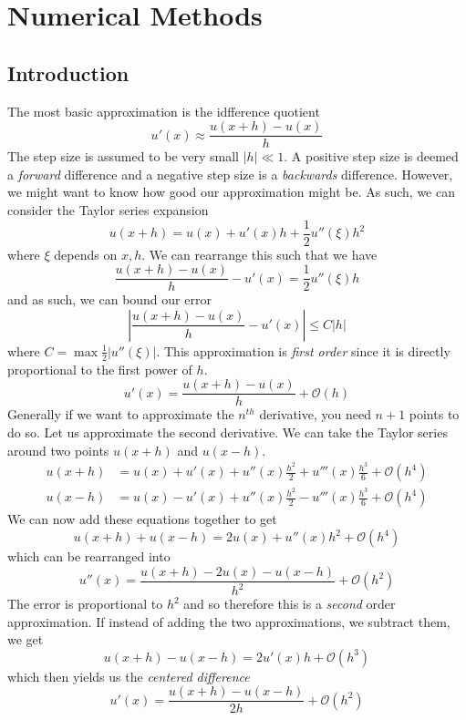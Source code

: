 \documentclass{article}
\numberwithin{equation}{section}
\begin{document}
\newpage
\section{Numerical Methods}
\subsection{Introduction}
The most basic approximation is the idfference quotient 
\begin{equation*}
    u'(x)\approx\frac{u(x+h)-u(x)}{h}
\end{equation*}
The step size is assumed to be very small $|h|\ll 1$. A positive step size is deemed a \emph{forward} difference and a negative step size is a \emph{backwards} difference. However, we might want to know how good our approximation might be. As such, we can consider the Taylor series expansion 
\begin{equation*}
    u(x+h)=u(x)+u'(x)h+\frac{1}{2}u''(\xi)h^2
\end{equation*}
where $\xi$ depends on $x,h$. We can rearrange this such that we have 
\begin{equation*}
    \frac{u(x+h)-u(x)}{h}-u'(x) = \frac{1}{2}u''(\xi)h
\end{equation*} 
and as such, we can bound our error 
\begin{equation*}
    \left|\frac{u(x+h)-u(x)}{h}-u'(x) \right| \leq C|h|
\end{equation*}
where $C=\max \frac{1}{2}|u''(\xi)|$. This approximation is \emph{first order} since it is directly proportional to the first power of $h$. 
\begin{equation*}
    u'(x)=\frac{u(x+h)-u(x)}{h}+\mathcal{O}(h)
\end{equation*}
Generally if we want to approximate the $n^{th}$ derivative, you need $n+1$ points to do so. Let us approximate the second derivative. We can take the Taylor series around two points $u(x+h)$ and $u(x-h)$.
\begin{equation}
    \begin{split}
        u(x+h)&=u(x)+u'(x)+u''(x)\frac{h^2}{2}+u'''(x)\frac{h^3}{6} +\mathcal{O}(h^4) \\ u(x-h)&=u(x)-u'(x)+u''(x)\frac{h^2}{2}-u'''(x)\frac{h^3}{6} +\mathcal{O}(h^4)
    \end{split}
\end{equation}
We can now add these equations together to get 
\begin{equation}
    u(x+h)+u(x-h)=2u(x)+u''(x)h^2+\mathcal{O}(h^4)
\end{equation}
which can be rearranged into 
\begin{equation}
    u''(x)=\frac{u(x+h)-2u(x)-u(x-h)}{h^2}+\mathcal{O}(h^2)
\end{equation}
The error is proportional to $h^2$ and so therefore this is a \emph{second} order approximation. If instead of adding the two approximations, we subtract them, we get 
\begin{equation}
    u(x+h)-u(x-h)=2u'(x)h+\mathcal{O}(h^3)
\end{equation}
which then yields us the \emph{centered difference}
\begin{equation}
    u'(x)=\frac{u(x+h)-u(x-h)}{2h} + \mathcal{O} (h^2)
\end{equation}
\end{document}
